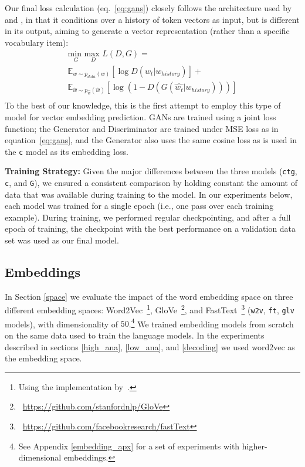 \documentclass[11pt,a4paper]{article}
\begin{document}
Our final loss calculation (eq.~\ref{eq:gans}) closely follows the architecture used by~\citet{yang2017improving} and \citet{yu2017seqgan}, in that it conditions over a history of token vectors as input, but is different in its output, aiming to generate a vector representation (rather than a specific vocabulary item):
\begin{equation}\label{eq:gans}
  \begin{split}
\underset{G}{\text{min }} \underset{D}{\text{max }} L(D,G) = \\ 
\mathbb{E}_{w\sim{p_{data}(w)}}[\log D(w_t|w_{history})] + \\
\mathbb{E}_{\hat{w}\sim{p_{\hat{w}}(\hat{w})}}[\log (1-D(G(\hat{w_t}|w_{history})))]\\
\end{split}
\end{equation}
To the best of our knowledge, this is the first attempt to employ this type of model for vector embedding prediction. 
GANs are trained using a joint loss function; the Generator and Discriminator are trained under MSE loss as in equation~\ref{eq:gans}, and the Generator also uses the same cosine loss as is used in the \texttt{c} model as its embedding loss. 

\noindent
\textbf{Training Strategy:}
Given the major differences between the three models ({\tt ctg}, {\tt c}, and {\tt G}), we ensured a consistent comparison by holding constant the amount of data that was available during training to the model.
In our experiments below, each model was trained for a single epoch (i.e., one pass over each training example).
During training, we performed regular checkpointing, and after a full epoch of training, the checkpoint with the best performance on a validation data set was used as our final model. 

\subsection{Embeddings}\label{subsec:methods:embeddings}
In Section \ref{space} we evaluate the impact of the word embedding space on three different embedding spaces: Word2Vec~\citep{mikolov2013distributed}\footnote{Using the implementation by~\citet{rehurek_lrec}.}, GloVe~\citep{pennington2014glove}\footnote{~\url{https://github.com/stanfordnlp/GloVe}}, and FastText~\citep{bojanowski2017enriching}\footnote{~\url{https://github.com/facebookresearch/fastText}} ({\tt w2v}, {\tt ft}, {\tt glv} models), with dimensionality of $50$.\footnote{See Appendix \ref{embedding_apx} for a set of experiments with higher-dimensional embeddings.} 
We trained embedding models from scratch on the same data used to train the language models. 
In the experiments described in sections \ref{high_ana}, \ref{low_ana}, and \ref{decoding} we used word2vec as the embedding space. 
\end{document}
